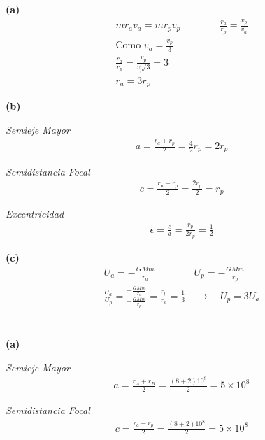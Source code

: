 \documentclass{article}
\begin{document}
\hfill 

\textbf{(a)} 
\begin{gather*}
  m r_a v_a = m r_p v_p \qquad \qquad \frac{r_a }{r_p } = \frac{v_p }{v_a }\\
  \text{Como } v_a = \frac{v_p }{3 }\\
  \frac{r_a }{r_p } = \frac{v_p }{v_p/3 } = 3 \\
  r_a = 3 r_p 
\end{gather*}

\hfill 

\textbf{(b)} 

\hfill 

\textit{Semieje Mayor} 
\begin{gather*}
  a = \frac{r_a + r_p }{2 } = \frac{4 }{2} r_p = 2r_p
\end{gather*}

\textit{Semidistancia Focal }
\begin{gather*}
  c = \frac{r_a - r_p }{2 } = \frac{2r_p }{2} = r_p  
\end{gather*}

\textit{Excentricidad }
\begin{gather}
  \epsilon = \frac{c }{a } = \frac{r_p }{2r_p } = \frac{1}{2}
\end{gather}

\hfill 

\textbf{(c) } 
\begin{gather*}
  U_a = - \frac{GMm }{r_a } \qquad \qquad U_p = - \frac{GMm }{r_p } \\ 
  \frac{U_a }{U_p } = \frac{- \frac{GMm }{r_a }}{- \frac{GMm }{r_p }} = \frac{r_p }{r_a } = \frac{1}{3} \quad \rightarrow \quad U_p = 3 U_a
\end{gather*}



\section{}

\hfill 

\textbf{(a)}

\hfill 

\textit{Semieje Mayor} 
\begin{gather*}
  a = \frac{r_A + r_B }{2 } = \frac{(8+2)10^8 }{2} = 5\times10^8
\end{gather*}

\textit{Semidistancia Focal }
\begin{gather*}
  c = \frac{r_a - r_p }{2 } = \frac{(8+2)10^8 }{2} = 5 \times 10^8
\end{gather*}
\end{document}
